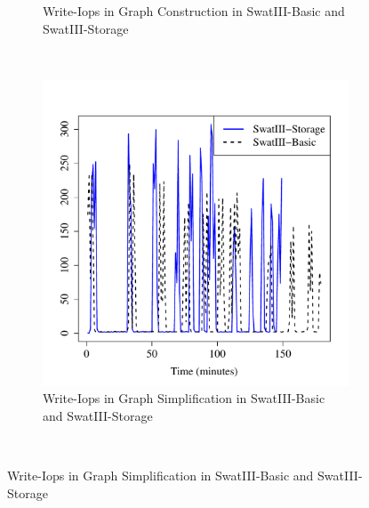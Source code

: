 \documentclass[conference]{IEEEtran}
\begin{document}
\begin{figure}[htb]
\begin{subfigure}[b]{0.23\textwidth}
                \caption{Write-Iops in Graph Construction in SwatIII-Basic and SwatIII-Storage}
                \label{fig:BGHddSsdWrIops}
        \end{subfigure}
        ~ %
        \begin{subfigure}[b]{0.23\textwidth}
                \includegraphics[width=\textwidth]{Figure/SystemData/Plots/ECHddSsdWrIops.pdf}
                \caption{Write-Iops in Graph Simplification in SwatIII-Basic and SwatIII-Storage}
                \label{fig:ECHddSsdWrIops}
        \end{subfigure}
        ~ %

\end{figure}
\end{document}
